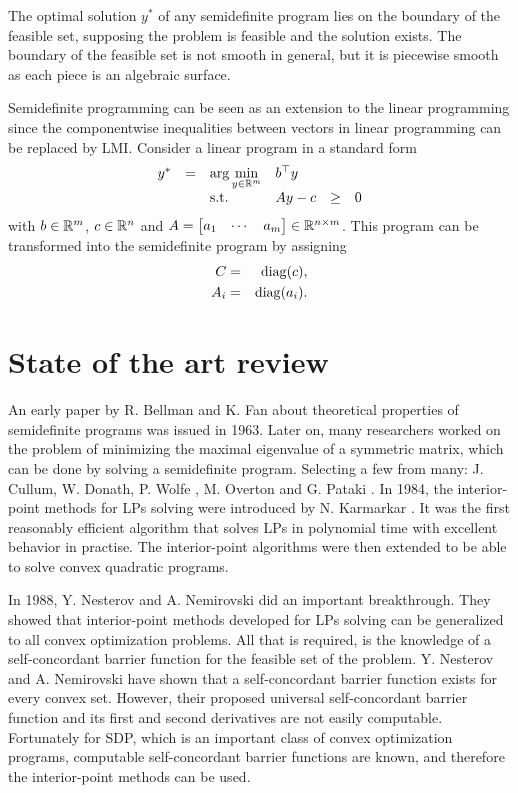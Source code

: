 The optimal solution $y^*$ of any semidefinite program lies on the boundary of the feasible set, supposing the problem is feasible and the solution exists.
The boundary of the feasible set is not smooth in general, but it is piecewise smooth as each piece is an algebraic surface.

\begin{example}
  Semidefinite programming can be seen as an extension to the linear programming since the componentwise inequalities between vectors in linear programming can be replaced by LMI.
  Consider a linear program in a standard form
  \begin{eqnarray}
    \begin{array}{rclrrclcll}
      y^* &=& \displaystyle \arg\min_{y\in\R^m} & \multicolumn{3}{l}{b^\top y} \\
      && \text{s.t.} & \displaystyle Ay - c &\geq& 0
    \end{array}
  \end{eqnarray}
  with $b\in\mathbb{R}^m$, $c\in\mathbb{R}^n$ and $A = \begin{bmatrix} a_1 & \cdots & a_m \end{bmatrix} \in\mathbb{R}^{n\times m}$.
  This program can be transformed into the semidefinite program  by assigning
  \begin{eqnarray}
    C &=& \operatorname{diag}(c),\\
    A_i &=& \operatorname{diag}(a_i).
  \end{eqnarray}
\end{example}

\section{State of the art review}
An early paper by R. Bellman and K. Fan about theoretical properties of semidefinite programs \cite{Bellman-Fan} was issued in 1963.
Later on, many researchers worked on the problem of minimizing the maximal eigenvalue of a symmetric matrix, which can be done by solving a semidefinite program.
Selecting a few from many: J. Cullum, W. Donath, P. Wolfe \cite{Cullum-Donath-Wolfe}, M. Overton \cite{Overton} and G. Pataki \cite{Pataki}.
In 1984, the interior-point methods for LPs solving were introduced by N. Karmarkar \cite{Karmarkar1984}.
It was the first reasonably efficient algorithm that solves LPs in polynomial time with excellent behavior in practise.
The interior-point algorithms were then extended to be able to solve convex quadratic programs.

In 1988, Y. Nesterov and A. Nemirovski \cite{Nesterov-Nemirovski} did an important breakthrough.
They showed that interior-point methods developed for LPs solving can be generalized to all convex optimization problems.
All that is required, is the knowledge of a self-concordant barrier function for the feasible set of the problem.
Y. Nesterov and A. Nemirovski have shown that a self-concordant barrier function exists for every convex set.
However, their proposed universal self-concordant barrier function and its first and second derivatives are not easily computable.
Fortunately for SDP, which is an important class of convex optimization programs, computable self-concordant barrier functions are known, and therefore the interior-point methods can be used.

